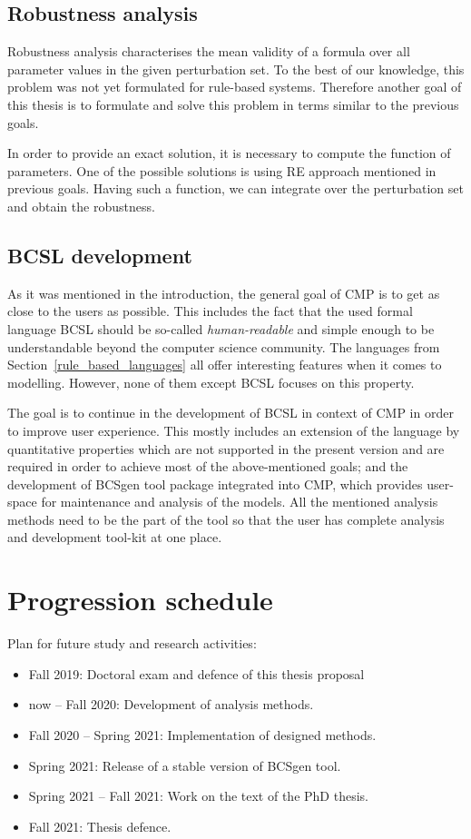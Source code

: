 \documentclass[11pt,a4paper]{report}
\begin{document}
\subsection{Robustness analysis}

Robustness analysis characterises the mean validity of a formula over all parameter values in the given perturbation set. To the best of our knowledge, this problem was not yet formulated for rule-based systems. Therefore another goal of this thesis is to formulate and solve this problem in terms similar to the previous goals. 

In order to provide an exact solution, it is necessary to compute the function of parameters. One of the possible solutions is using RE approach mentioned in previous goals. Having such a function, we can integrate over the perturbation set and obtain the robustness.

\subsection{BCSL development}

As it was mentioned in the introduction, the general goal of CMP is to get as close to the users as possible. This includes the fact that the used formal language BCSL should be so-called \emph{human-readable} and simple enough to be understandable beyond the computer science community. The languages from Section~\ref{rule_based_languages} all offer interesting features when it comes to modelling. However, none of them except BCSL focuses on this property.

The goal is to continue in the development of BCSL in context of CMP in order to improve user experience. This mostly includes an extension of the language by quantitative properties which are not supported in the present version and are required in order to achieve most of the above-mentioned goals; and the development of BCSgen tool package integrated into CMP, which provides user-space for maintenance and analysis of the models. All the mentioned analysis methods need to be the part of the tool so that the user has complete analysis and development tool-kit at one place.

\section{Progression schedule}

Plan for future study and research activities:

\begin{itemize}
\item Fall 2019: Doctoral exam and defence of this thesis proposal
\item now -- Fall 2020: Development of analysis methods.
\item Fall 2020 -- Spring 2021: Implementation of designed methods.
\item Spring 2021: Release of a stable version of BCSgen tool.
\item Spring 2021 -- Fall 2021: Work on the text of the PhD thesis.
\item Fall 2021: Thesis defence.
\end{itemize}
\end{document}
